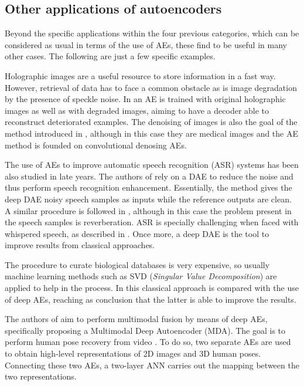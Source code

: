 \documentclass[preprint,5p,compress]{elsarticle}
\begin{document}
\subsection{Other applications of autoencoders}
Beyond the specific applications within the four previous categories, which can be considered as usual in terms of the use of AEs, these find to be useful in many other cases. The following are just a few specific examples.

Holographic images \cite{DigitalHolography} are a useful resource to store information in a fast way. However, retrieval of data has to face a common obstacle as is image degradation by the presence of speckle noise. In \cite{Shimobaba2017} an AE is trained with original holographic images as well as with degraded images, aiming to have a decoder able to reconstruct deteriorated examples. The denoising of images is also the goal of the method introduced in \cite{DenoisingMedicalImages}, although in this case they are medical images and the AE method is founded on convolutional denosing AEs.

The use of AEs to improve automatic speech recognition (ASR) systems has been also studied in late years. The authors of \cite{SpeechDAE} rely on a DAE to reduce the noise and thus perform speech recognition enhancement. Essentially, the method gives the deep DAE noisy speech samples as inputs while the reference outputs are clean. A similar procedure is followed in \cite{ReverberantSpeechDAE}, although in this case the problem present in the speech samples is reverberation. ASR is specially challenging when faced with whispered speech, as described in \cite{WhisperedSppechDAE}. Once more, a deep DAE is the tool to improve results from classical approaches.

The procedure to curate biological databases is very expensive, so usually machine learning methods such as SVD (\textit{Singular Value Decomposition}) \cite{SVD} are applied to help in the process. In \cite{ANNsPCA2} this classical approach is compared with the use of deep AEs, reaching as conclusion that the latter is able to improve the results.

The authors of  \cite{Hong2015} aim to perform multimodal fusion by means of deep AEs, specifically proposing a Multimodal Deep Autoencoder (MDA). The goal is to perform human pose recovery from video \cite{HumanPoseRecovery}. To do so, two separate AEs are used to obtain high-level representations of 2D images and 3D human poses. Connecting these two AEs, a two-layer ANN carries out the mapping between the two representations.
\end{document}

